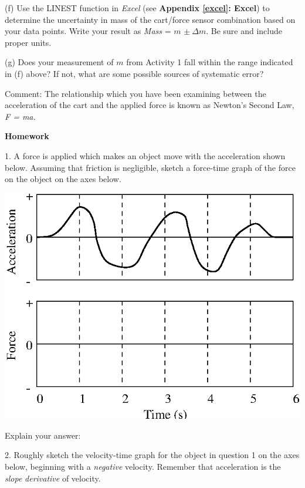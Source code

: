 (f) Use the LINEST function in \textit{Excel} (see \textbf{Appendix \ref{excel}: Excel}) to determine the uncertainty in mass of the cart/force sensor combination based on your data points.  Write your result as \textit{Mass} = $m$ \( \pm \ \Delta  m\). Be sure and include proper units.
\answerspace{20mm}

(g) Does your measurement of $m$ from Activity 1 fall within the range indicated in (f) above? If not, what are some possible sources of systematic error?
\answerspace{20mm}

Comment: The relationship which you have been examining between the acceleration of the cart and the applied force is known as Newton's Second Law, \textit{F = ma.}

\pagebreak[2]
\textbf{Homework} 

1. A force is applied which makes an object move with the acceleration shown
below. Assuming that friction is negligible, sketch a force-time graph of the
force on the object on the axes below.

\vspace{0.3cm}
{\par\centering \includegraphics{force1/force1_fig6.eps} \par}
\vspace{0.3cm}

Explain your answer:
\vspace{10mm}

2. Roughly sketch the velocity-time graph for the object in question 1 on the
axes below, beginning with a \textit{negative} velocity.  Remember that acceleration 
is the 
\ifForOneTwentyFive
   \textit{slope} 
\else
   \textit{derivative} 
\fi
of velocity.

